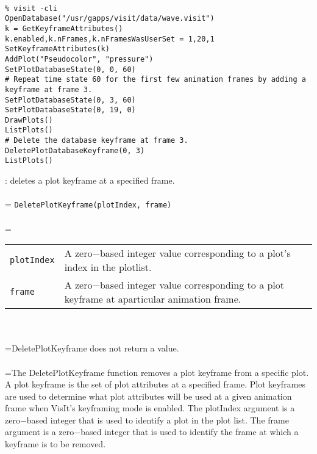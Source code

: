 \documentclass[10pt,a4paper]{report}
\begin{document}
\\[-6mm]
\begin{verbatim}% visit -cli
OpenDatabase("/usr/gapps/visit/data/wave.visit")
k = GetKeyframeAttributes()
k.enabled,k.nFrames,k.nFramesWasUserSet = 1,20,1
SetKeyframeAttributes(k)
AddPlot("Pseudocolor", "pressure")
SetPlotDatabaseState(0, 0, 60)
# Repeat time state 60 for the first few animation frames by adding a
keyframe at frame 3.
SetPlotDatabaseState(0, 3, 60)
SetPlotDatabaseState(0, 19, 0)
DrawPlots()
ListPlots()
# Delete the database keyframe at frame 3.
DeletePlotDatabaseKeyframe(0, 3)
ListPlots()
\end{verbatim}
\newpage


{}
: deletes a plot keyframe at a specified frame.\\[-3mm]

 \\ 
\hangindent=\parindent 
\verb!DeletePlotKeyframe(plotIndex, frame)!\\ [-3mm]

 \\ 
\hangindent=\parindent 
\begin{tabular}{lp{9cm}}
\verb!plotIndex! & A zero$-$based integer value corresponding to a plot's index in the plotlist. \\
\verb!frame! & A zero$-$based integer value corresponding to a plot keyframe at aparticular animation frame. \\
\end{tabular} \\[-2mm]


 \\ 
\hangindent=\parindent DeletePlotKeyframe does not return a value. \\[-3mm] 

 \\ 
\hangindent=\parindent The DeletePlotKeyframe function removes a plot keyframe from a specific plot. A plot keyframe is the set of plot attributes at a specified frame. Plot keyframes are used to determine what plot attributes will be used at a given animation frame when VisIt's keyframing mode is enabled. The plotIndex argument is a zero$-$based integer that is used to identify a plot in the plot list. The frame argument is a zero$-$based integer that is used to identify the frame at which a keyframe is to be removed. \\[-3mm] 
\end{document}
